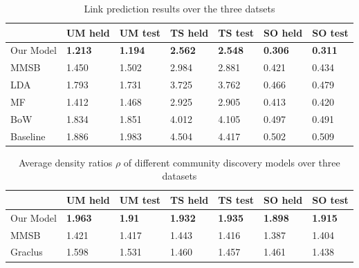 \documentclass{sig-alternate}
\begin{document}
\begin{table}
\begin{center} 
\begin{tabular}{p{1cm}|p{0.7cm}|p{0.7cm}|p{0.7cm}|p{0.7cm}|p{0.7cm}|p{0.7cm}|}
  & UM held & UM test & TS held & TS test & SO held & SO test \\\hline
Our Model & \textbf{1.213} &\textbf{1.194} &\textbf{2.562} & \textbf{2.548} & 
\textbf{0.306}& \textbf{0.311} \\\hline 
MMSB &1.450& 1.502 & 2.984& 2.881 &0.421 & 0.434 \\\hline 
LDA &1.793& 1.731	&3.725 & 3.762 &0.466 & 0.479\\\hline
MF & 1.412 & 1.468 & 2.925 & 2.905 & 0.413 & 0.420 \\\hline
BoW &1.834 & 1.851 & 4.012 & 4.105 & 0.497 & 0.491 \\\hline
Baseline &1.886& 1.983 &4.504 &4.417&0.502& 0.509\\\hline
\end{tabular}
\vspace*{-0.5\baselineskip}
\caption{\small{Link prediction results over the three datsets}}
\label{tab:predictionResults}
\end{center}
\vspace*{-0.5\baselineskip}
\end{table}

\begin{table}
\begin{center} 
\begin{tabular}{p{1cm}|p{0.7cm}|p{0.7cm}|p{0.7cm}|p{0.7cm}|p{0.7cm}|p{0.7cm}|}
  & UM held & UM test & TS held & TS test & SO held & SO test \\\hline
Our Model & \textbf{1.963} &\textbf{1.91} &\textbf{1.932} & \textbf{1.935} & 
\textbf{1.898}& \textbf{1.915} \\\hline 
MMSB &1.421& 1.417 & 1.443& 1.416 &1.387 & 1.404 \\\hline 
Graclus &1.598& 1.531	&1.460 & 1.457 &1.461 & 1.438\\\hline
\end{tabular}
\vspace*{-0.5\baselineskip}
\caption{\small{Average density ratios $\rho$ of different community 
discovery models over three datasets}}
\label{tab:rhoResults}
\end{center}
\vspace*{-1\baselineskip}
\end{table}
\end{document}
